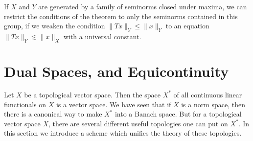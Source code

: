 If $X$ and $Y$ are generated by a family of seminorms closed under maxima, we can restrict the conditions of the theorem to only the seminorms contained in this group, if we weaken the condition $\| Tx \|_Y \leq \| x \|_Y$ to an equation $\| Tx \|_Y \lesssim \| x \|_X$ with a universal constant.

\section{Dual Spaces, and Equicontinuity}

Let $X$ be a topological vector space. Then the space $X^*$ of all continuous linear functionals on $X$ is a vector space. We have seen that if $X$ is a norm space, then there is a canonical way to make $X^*$ into a Banach space. But for a topological vector space $X$, there are several different useful topologies one can put on $X^*$. In this section we introduce a scheme which unifies the theory of these topologies.

